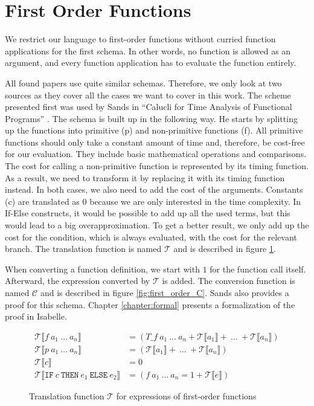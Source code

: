 

\section{First Order Functions} \label{chapter:first_order}

We restrict our language to first-order functions without curried function applications for the first schema.
In other words, no function is allowed as an argument, and every function application has to evaluate the function entirely.

All found papers use quite similar schemas.
Therefore, we only look at two sources as they cover all the cases we want to cover in this work.
The scheme presented first was used by Sands in ``Calucli for Time Analysis of Functional Programs'' \parencite{sands}.
The schema is built up in the following way.
He starts by splitting up the functions into primitive (p) and non-primitive functions (f).
All primitive functions should only take a constant amount of time and, therefore, be cost-free for our evaluation.
They include basic mathematical operations and comparisons.
The cost for calling a non-primitive function is represented by its timing function.
As a result, we need to transform it by replacing it with its timing function instead.
In both cases, we also need to add the cost of the arguments.
Constants (c) are translated as $0$ because we are only interested in the time complexity.
In If-Else constructs, it would be possible to add up all the used terms,
but this would lead to a big overapproximation.
To get a better result, we only add up the cost for the condition, which is always evaluated, with the cost for the relevant branch.
The translation function is named $\mathcal{T}$ and is described in figure \ref{fig:first_order_T}.

When converting a function definition, we start with $1$ for the function call itself.
Afterward, the expression converted by $\mathcal{T}$ is added.
The conversion function is named $\mathcal{C}$ and is described in figure \ref{fig:first_order_C}.
Sands also provides a proof for this schema.
Chapter \ref{chapter:formal} presents a formalization of the proof in Isabelle.

\begin{figure}
  \begin{align*}
    \mathcal{T}\llbracket f\ a_{1}\ \dots\ a_{n}\rrbracket &= (T\_f\ a_{1}\ \dots\ a_{n} + \mathcal{T}\llbracket a_{1}\rrbracket +\ \dots\ + \mathcal{T}\llbracket a_{n}\rrbracket)\\
    \mathcal{T}\llbracket p\ a_{1}\ \dots\ a_{n}\rrbracket &= (\mathcal{T}\llbracket a_{1}\rrbracket +\ \dots\ + \mathcal{T}\llbracket a_{n}\rrbracket)\\
    \mathcal{T}\llbracket c\rrbracket &= 0\\
    \mathcal{T}\llbracket \texttt{IF}\ c\ \texttt{THEN}\ e_{1}\ \texttt{ELSE}\ e_{2}\rrbracket &= (f\ a_{1}\ \dots\ a_{n} = 1 + \mathcal{T}\llbracket e\rrbracket)
  \end{align*}
  \caption{Translation function $\mathcal{T}$ for expressions of first-order functions}
  \label{fig:first_order_T}
\end{figure}

